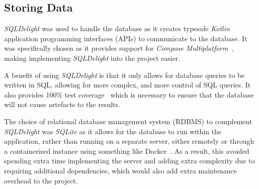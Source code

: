 \documentclass[../dissertation.tex]{subfiles}
\begin{document}
\subsection{Storing Data}
\textit{SQLDelight} was used to handle the database as it creates typesafe \textit{Kotlin}
application programming interfaces (APIs) to
communicate to the database.
It was specifically chosen as it provides support for \textit{Compose Multiplatform}~\cite{sqldelight},
making implementing \textit{SQLDelight} into the project easier.

A benefit of using \textit{SQLDelight} is that it only allows for database queries to be
written in SQL, allowing for more complex, and more control of SQL queries. It also
provides 100\% test coverage~\cite{sqlite:tests} which is necessary to ensure that
the database will not cause artefacts to the results.

The choice of relational database management system (RDBMS) to complement \textit{SQLDelight}
was \textit{SQLite} as it allows for the database to run within the application,
rather than running on a separate server, either remotely or through a containerized
instance using something like Docker~\cite{docker:container}. As a result,
this avoided spending extra time implementing the server and
adding extra complexity due to requiring additional dependencies, which would also
add extra maintenance overhead to the project.
\end{document}
